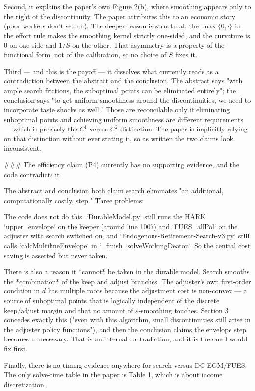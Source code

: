 Second, it explains the paper's own Figure 2(b), where smoothing appears only to the right of the discontinuity. The paper attributes this to an economic story (poor workers don't search). The deeper reason is structural: the $\max\{0,\cdot\}$ in the effort rule makes the smoothing kernel strictly one-sided, and the curvature is $0$ on one side and $1/S$ on the other. That asymmetry is a property of the functional form, not of the calibration, so no choice of $S$ fixes it.

Third — and this is the payoff — it dissolves what currently reads as a contradiction between the abstract and the conclusion. The abstract says "with ample search frictions, the suboptimal points can be eliminated entirely"; the conclusion says "to get uniform smoothness around the discontinuities, we need to incorporate taste shocks as well." Those are reconcilable only if eliminating suboptimal points and achieving uniform smoothness are different requirements — which is precisely the $C^1$-versus-$C^2$ distinction. The paper is implicitly relying on that distinction without ever stating it, so as written the two claims look inconsistent.

### The efficiency claim (P4) currently has no supporting evidence, and the code contradicts it

The abstract and conclusion both claim search eliminates "an additional, computationally costly, step." Three problems:

The code does not do this. `DurableModel.py` still runs the HARK `upper_envelope` on the keeper (around line 1007) and `FUES_allPol` on the adjuster with search switched on, and `Endogenous-Retirement-Search-v3.py` still calls `calcMultilineEnvelope` in `_finish_solveWorkingDeaton`. So the central cost saving is asserted but never taken.

There is also a reason it *cannot* be taken in the durable model. Search smooths the *combination* of the keep and adjust branches. The adjuster's own first-order condition in $d$ has multiple roots because the adjustment cost is non-convex — a source of suboptimal points that is logically independent of the discrete keep/adjust margin and that no amount of $\varepsilon$-smoothing touches. Section 3 concedes exactly this ("even with this algorithm, small discontinuities still arise in the adjuster policy functions"), and then the conclusion claims the envelope step becomes unnecessary. That is an internal contradiction, and it is the one I would fix first.

Finally, there is no timing evidence anywhere for search versus DC-EGM/FUES. The only solve-time table in the paper is Table 1, which is about income discretization.

